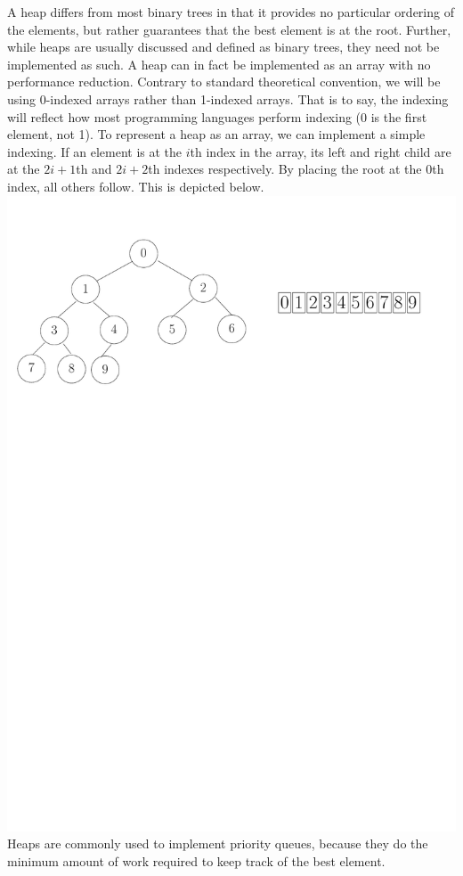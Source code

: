 A heap differs from most binary trees in that it provides no particular
ordering of the elements, but rather guarantees that the best element is
at the root. Further, while heaps are usually discussed and defined
as binary trees, they need not be implemented as such.
A heap can in fact be implemented as an array with no performance reduction.
Contrary to standard theoretical convention, we will be using 0-indexed arrays
rather than 1-indexed arrays. That is to say, the indexing will reflect how
most programming languages perform indexing (0 is the first element, not 1).
To represent a heap as an array, we can implement a simple indexing. 
If an element is at the $i$th
index in the array, its left and right child are at the $2i+1$th and $2i+2$th 
indexes respectively. By placing the root at the $0$th index, all others follow.
This is depicted below.
{
  \includegraphics[scale=0.5]{heapTreeArray}
  \label{fig:heapTreeArray}
}
Heaps are commonly used to implement priority queues, because they do the
minimum amount of work required to keep track of the best element.

